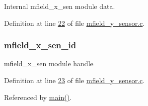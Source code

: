Internal mfield\+\_\+x\+\_\+sen module data. 



Definition at line \hyperlink{a00052_source_l00022}{22} of file \hyperlink{a00052_source}{mfield\+\_\+y\+\_\+sensor.\+c}.

\hypertarget{a00052_a19a33e680bf19d1aed76750132ed8b64}{
\subsubsection[{mfield\+\_\+x\+\_\+sen\+\_\+id}]{ mfield\+\_\+x\+\_\+sen\+\_\+id}}\label{a00052_a19a33e680bf19d1aed76750132ed8b64}


mfield\+\_\+x\+\_\+sen module handle 



Definition at line \hyperlink{a00052_source_l00023}{23} of file \hyperlink{a00052_source}{mfield\+\_\+y\+\_\+sensor.\+c}.



Referenced by \hyperlink{a00048_source_l00080}{main()}.

